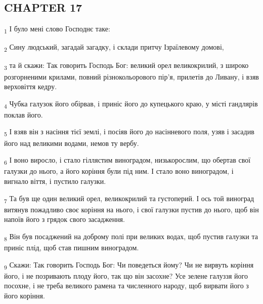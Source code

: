\subsection{CHAPTER 17}
\begin{tcolorbox}
\textsubscript{1} І було мені слово Господнє таке:
\end{tcolorbox}
\begin{tcolorbox}
\textsubscript{2} Сину людський, загадай загадку, і склади притчу Ізраїлевому домові,
\end{tcolorbox}
\begin{tcolorbox}
\textsubscript{3} та й скажи: Так говорить Господь Бог: великий орел великокрилий, з широко розгорненими крилами, повний різнокольорового пір'я, прилетів до Ливану, і взяв верховіття кедру.
\end{tcolorbox}
\begin{tcolorbox}
\textsubscript{4} Чубка галузок його обірвав, і приніс його до купецького краю, у місті гандлярів поклав його.
\end{tcolorbox}
\begin{tcolorbox}
\textsubscript{5} І взяв він з насіння тієї землі, і посіяв його до насінневого поля, узяв і засадив його над великими водами, немов ту вербу.
\end{tcolorbox}
\begin{tcolorbox}
\textsubscript{6} І воно виросло, і стало гіллястим виноградом, низькорослим, що обертав свої галузки до нього, а його коріння були під ним. І стало воно виноградом, і вигнало віття, і пустило галузки.
\end{tcolorbox}
\begin{tcolorbox}
\textsubscript{7} Та був ще один великий орел, великокрилий та густоперий. І ось той виноград витянув пожадливо своє коріння на нього, і свої галузки пустив до нього, щоб він напоїв його з грядок свого засадження.
\end{tcolorbox}
\begin{tcolorbox}
\textsubscript{8} Він був посаджений на доброму полі при великих водах, щоб пустив галузки та приніс плід, щоб став пишним виноградом.
\end{tcolorbox}
\begin{tcolorbox}
\textsubscript{9} Скажи: Так говорить Господь Бог: Чи поведеться йому? Чи не вирвуть коріння його, і не позривають плоду його, так що він засохне? Усе зелене галуззя його посохне, і не треба великого рамена та численного народу, щоб вирвати його з його коріння.
\end{tcolorbox}

